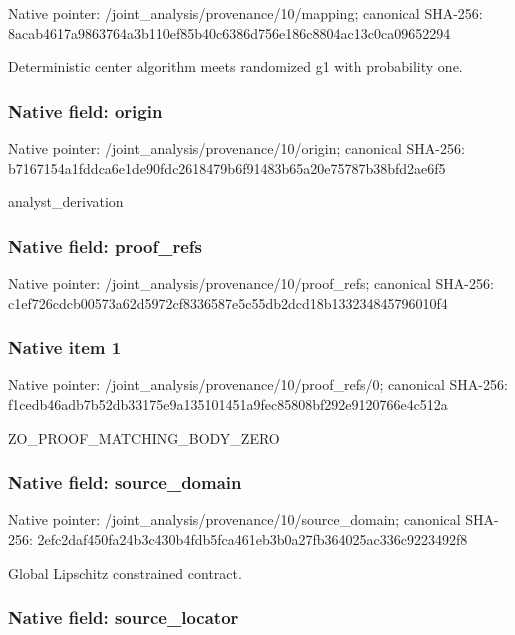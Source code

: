\documentclass[10pt,a4paper]{article}
\begin{document}
Native pointer: /joint\_analysis/provenance/10/mapping; canonical SHA-256: 8acab4617a9863764a3b110e\allowbreak{}f85b40c6386d756e186c8804\allowbreak{}ac13c0ca09652294


Deterministic center algorithm meets randomized g1 with probability one.


\subsubsection{Native field: origin}


Native pointer: /joint\_analysis/provenance/10/origin; canonical SHA-256: b7167154a1fddca6e1de90fd\allowbreak{}c2618479b6f91483b65a20e7\allowbreak{}5787b38bfd2ae6f5


analyst\_derivation


\subsubsection{Native field: proof\_refs}


Native pointer: /joint\_analysis/provenan\allowbreak{}ce/10/proof\_refs; canonical SHA-256: c1ef726cdcb00573a62d5972\allowbreak{}cf8336587e5c55db2dcd18b1\allowbreak{}33234845796010f4



\subsubsection{Native item 1}


Native pointer: /joint\_analysis/provenan\allowbreak{}ce/10/proof\_refs/0; canonical SHA-256: f1cedb46adb7b52db33175e9\allowbreak{}a135101451a9fec85808bf29\allowbreak{}2e9120766e4c512a


ZO\_PROOF\_MATCHING\_BODY\_ZERO


\subsubsection{Native field: source\_domain}


Native pointer: /joint\_analysis/provenan\allowbreak{}ce/10/source\_domain; canonical SHA-256: 2efc2daf450fa24b3c430b4f\allowbreak{}db5fca461eb3b0a27fb36402\allowbreak{}5ac336c9223492f8


Global Lipschitz constrained contract.


\subsubsection{Native field: source\_locator}
\end{document}
